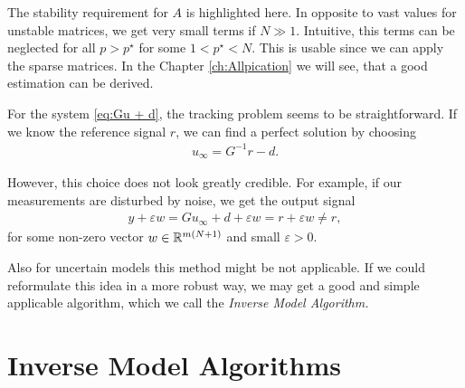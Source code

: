 The stability requirement for $A$ is highlighted here. In opposite to vast values for unstable matrices, we get very small terms if $N \gg 1$. Intuitive, this terms can be neglected for all $p > p^\star$ for some $1<p^\star<N$. This is usable since we can apply the sparse matrices. In the Chapter \ref{ch:Allpication} we will see, that a good estimation can be derived. 

For the system \eqref{eq:Gu + d}, the tracking problem seems to be straightforward.
If we know the reference signal $r$, we can find a perfect solution by choosing 
\begin{align}
u_\infty = G^{-1} r -d.
\end{align}

However, this choice does not look greatly credible. 
For example, if our measurements are disturbed by noise, we get the output signal
\begin{align}
y + \varepsilon w = G u_\infty + d + \varepsilon w = r + \varepsilon w \neq r,
\end{align}
for some non-zero vector $w \in {\mathbb{R}}^{m(N+1)}$ and small $\varepsilon > 0$. 

Also for uncertain models this method might be not applicable. 
If we could reformulate this idea in a more robust way, we may get a good and simple applicable algorithm, which we call the \textit{Inverse Model Algorithm.}

\section{Inverse Model Algorithms}

